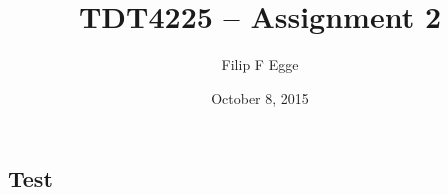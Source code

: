 \documentclass{article}
\begin{document}
\title{TDT4225 -- Assignment 2}
\author{Filip F Egge}
\date{October 8, 2015}
\maketitle

\newpage

\subsection*{Test}
\end{document}
